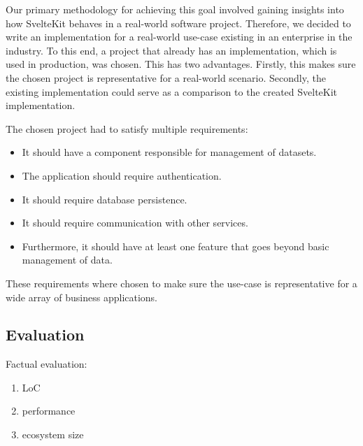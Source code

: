 Our primary methodology for achieving this goal involved gaining insights into how SvelteKit behaves in a real-world software project. Therefore, we decided to write an implementation for a real-world use-case existing in an enterprise in the industry. To this end, a project that already has an implementation, which is used in production, was chosen. This has two advantages. Firstly, this makes sure the chosen project is representative for a real-world scenario. Secondly, the existing implementation could serve as a comparison to the created SvelteKit implementation.

The chosen project had to satisfy multiple requirements:
\begin{itemize}
    \item It should have a component responsible for management of datasets.
    \item The application should require authentication.
    \item It should require database persistence.
    \item It should require communication with other services.  
    \item Furthermore, it should have at least one feature that goes beyond basic management of data.
\end{itemize}
These requirements where chosen to make sure the use-case is representative for a wide array of business applications. 

\subsection{Evaluation}

Factual evaluation:
\begin{enumerate}
    \item LoC
    \item performance
    \item ecosystem size
\end{enumerate}